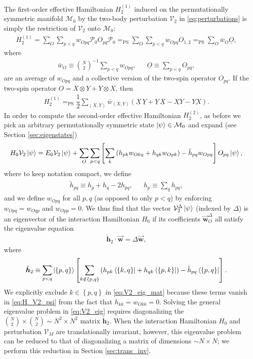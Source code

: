 \documentclass[nofootinbib,notitlepage,11pt]{revtex4-2}
\newcommand{\f}[2]{\dfrac{#1}{#2}} %
\newcommand{\p}[1]{\left(#1\right)} %
\renewcommand{\sp}[1]{\left[#1\right]} %
\renewcommand{\set}[1]{\left\{#1\right\}} %
\renewcommand{\c}{\cdot} %
\newcommand{\m}{\bm} %
\renewcommand{\v}{\vec} %
\newcommand{\1}{\mathds{1}}
\newcommand{\M}{\mathcal{M}}
\renewcommand{\P}{\mathcal{P}}
\newcommand{\V}{\mathcal{V}}
\newcommand{\EQPS}{=_{\text{PS}}}
\newcommand{\col}{\underline}
\begin{document}
The first-order effective Hamiltonian $H_2^{(1)}$ induced on the
permutationally symmetric manifold $\M_0$ by the two-body perturbation
$\V_2$ in \eqref{eq:perturbations} is simply the restriction of $\V_2$
onto $\M_0$:
\begin{align}
  H_2^{(1)} = \sum_O \sum_{p<q} w_{Opq} \P_0 O_{pq} \P_0
  \EQPS \sum_O \sum_{p<q} w_{Opq} O_{1,2}
  \EQPS \sum_O \bar w_O \col{O},
\end{align}
where
\begin{align}
  \bar w_O \equiv {N \choose 2}^{-1} \sum_{p<q} w_{Opq},
  &&
  \col{O} \equiv \sum_{p<q} O_{pq},
\end{align}
are an average of $w_{Opq}$ and a collective version of the two-spin
operator $O_{pq}$.  If the two-spin operator
$O=X\otimes Y+Y\otimes X$, then
\begin{align}
  H_2^{(1)} \EQPS \f12 \sum_{\p{X,Y}} \bar w_{\p{X,Y}}
  \p{\col{X}\,\col{Y} + \col{Y}\,\col{X} - \col{XY} - \col{YX}}.
\end{align}
In order to compute the second-order effective Hamiltonian
$H_2^{(2)}$, as before we pick an arbitrary permutationally symmetric
state $\ket\psi\in\M_0$ and expand (see Section \ref{sec:eigenstates})
\begin{align}
  H_0 \V_2 \ket\psi
  = E_0 \V_2 \ket\psi
  + \sum_O \sum_{p<q}
  \sp{\sum_k \p{h_{pk} w_{Okq} + h_{qk} w_{Opk}}
    - \tilde h_{pq} w_{Opq}}
  O_{pq} \ket\psi,
  \label{eq:H_V2_psi}
\end{align}
where to keep notation compact, we define
\begin{align}
  \tilde h_{pq} \equiv h_p + h_q - 2 h_{pq},
  &&
  h_p \equiv \sum_q h_{pq},
\end{align}
and we define $w_{Opq}$ for all $p,q$ (as opposed to only $p<q$) by
enforcing $w_{Opq}=w_{Oqp}$ and $w_{Opp}=0$.  We thus find that the
vector $\V_2^\Delta\ket\psi$ (indexed by $\Delta$) is an eigenvector
of the interaction Hamiltonian $H_0$ if its coefficients
$\v{\m w}_O^\Delta$ all satisfy the eigenvalue equation
\begin{align}
  \check{\m h}_2 \c \v{\m w} = \Delta \v{\m w},
  \label{eq:V2_eig}
\end{align}
where
\begin{align}
  \check{\m h}_2
  \equiv \sum_{p<q} \ket{\set{p,q}} \sp{\sum_{k\notin\set{p,q}}
    \p{h_{pk} \bra{\set{k,q}} + h_{qk} \bra{\set{p,k}}}
    - \tilde h_{pq} \bra{\set{p,q}}}.
  \label{eq:V2_eig_mat}
\end{align}
We explicitly exclude $k\in\set{p,q}$ in \eqref{eq:V2_eig_mat} because
these terms vanish in \eqref{eq:H_V2_psi} from the fact that
$h_{kk}=w_{Okk}=0$.  Solving the general eigenvalue problem in
\eqref{eq:V2_eig} requires diagonalizing the
${N \choose 2}\times{N \choose 2}\sim N^2\times N^2$ matrix
$\check{\m h}_2$.  When the interaction Hamiltonian $H_0$ and
perturbation $\V_M$ are translationally invariant, however, this
eigenvalue problem can be reduced to that of diagonalizing a matrix of
dimensions $\sim N\times N$; we perform this reduction in Section
\ref{sec:trans_inv}.
\end{document}
